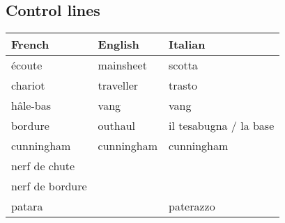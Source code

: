 \documentclass[a4paper, 12pt, twoside]{article}
\begin{document}
    \begin{indt}{\section{Control lines}} %
        \begin{tabular}{|l|l|l|}
            \hline %
            \textbf{French}
            & \textbf{English}
            & \textbf{Italian}
            \\
            \hline
            \hline %
            écoute %
            & mainsheet
            & scotta
            \\
            \hline %
            chariot %
            & traveller
            & trasto
            \\
            \hline %
            hâle-bas %
            & vang
            & vang
            \\
            \hline %
            bordure %
            & outhaul 
            & il tesabugna / la base
            \\
            \hline %
            cunningham %
            & cunningham
            & cunningham
            \\
            \hline %
            nerf de chute %
            &
            &
            \\
            \hline %
            nerf de bordure %
            &
            &
            \\
            \hline %
            patara %
            &
            & paterazzo
            \\
            \hline %
        \end{tabular}
    \end{indt} %
\end{document}
